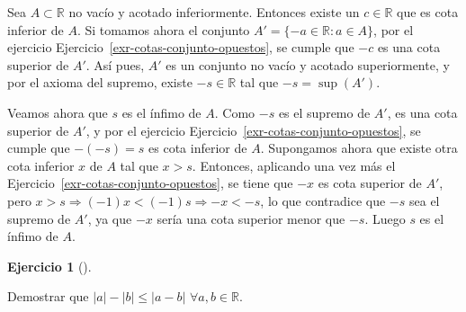 \documentclass[
  a4paper,
]{scrreport}
\theoremstyle{definition}
\newtheorem{exercise}{Ejercicio}[chapter]
\theoremstyle{remark}
\begin{document}
\begin{tcolorbox}[enhanced jigsaw, colbacktitle=quarto-callout-tip-color!10!white, coltitle=black, arc=.35mm, opacityback=0, breakable, colback=white, bottomtitle=1mm, opacitybacktitle=0.6, rightrule=.15mm, colframe=quarto-callout-tip-color-frame, title=\textcolor{quarto-callout-tip-color}{\faLightbulb}\hspace{0.5em}{Solución}, toptitle=1mm, titlerule=0mm, bottomrule=.15mm, left=2mm, leftrule=.75mm, toprule=.15mm]

Sea \(A\subset\mathbb{R}\) no vacío y acotado inferiormente. Entonces
existe un \(c\in\mathbb{R}\) que es cota inferior de \(A\). Si tomamos
ahora el conjunto \(A'=\{-a\in\mathbb{R}: a\in A\}\), por el ejercicio
Ejercicio~\ref{exr-cotas-conjunto-opuestos}, se cumple que \(-c\) es una
cota superior de \(A'\). Así pues, \(A'\) es un conjunto no vacío y
acotado superiormente, y por el axioma del supremo, existe
\(-s\in\mathbb{R}\) tal que \(-s=\sup(A')\).

Veamos ahora que \(s\) es el ínfimo de \(A\). Como \(-s\) es el supremo
de \(A'\), es una cota superior de \(A'\), y por el ejercicio
Ejercicio~\ref{exr-cotas-conjunto-opuestos}, se cumple que \(-(-s)=s\)
es cota inferior de \(A\). Supongamos ahora que existe otra cota
inferior \(x\) de \(A\) tal que \(x>s\). Entonces, aplicando una vez más
el Ejercicio~\ref{exr-cotas-conjunto-opuestos}, se tiene que \(-x\) es
cota superior de \(A'\), pero
\(x>s\Rightarrow (-1)x<(-1)s \Rightarrow -x<-s\), lo que contradice que
\(-s\) sea el supremo de \(A'\), ya que \(-x\) sería una cota superior
menor que \(-s\). Luego \(s\) es el ínfimo de \(A\).

\end{tcolorbox}

\leavevmode{}%
\begin{exercise}[]\label{exr-propiedad-valor-absoluto}

Demostrar que \(|a|-|b|\leq |a-b|\) \(\forall a,b\in\mathbb{R}\).

\end{exercise}
\end{document}
